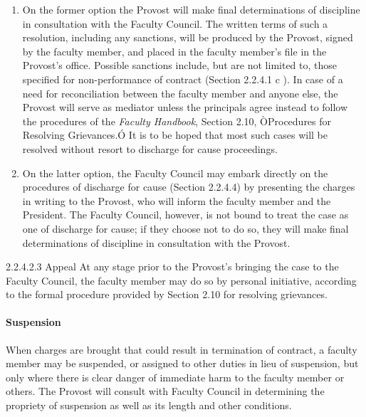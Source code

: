 \documentclass[letterpaper, 11pt]{article}
\begin{document}
\begin{enumerate}[label=\alph*)]
{						\begin{enumerate}[label=\arabic*)]
							\item{On the former option the Provost will make final determinations of discipline in consultation with the Faculty Council.  The written terms of such a resolution, including any sanctions, will be produced by the Provost, signed by the faculty member, and placed in the faculty member's file in the Provost's office.  Possible sanctions include, but are not limited to, those specified for non-performance of contract (Section 2.2.4.1 c ).  In case of a need for reconciliation between the faculty member and anyone else, the Provost will serve as mediator unless the principals agree instead to follow the procedures of the \emph{Faculty Handbook}, Section 2.10, ÒProcedures for Resolving Grievances.Ó  It is to be hoped that most such cases will be resolved without resort to discharge for cause proceedings.}
							\item{On the latter option, the Faculty Council may embark directly on the procedures of discharge for cause (Section 2.2.4.4) by presenting the charges in writing to the Provost, who will inform the faculty member and the President.  The Faculty Council, however, is not bound to treat the case as one of discharge for cause; if they choose not to do so, they will make final determinations of discipline in consultation with the Provost.}
						\end{enumerate}
					}
				\end{enumerate}
				2.2.4.2.3 Appeal
				At any stage prior to the Provost's bringing the case to the Faculty Council, the faculty member may do so by personal initiative, according to the formal procedure provided by Section 2.10 for resolving grievances.
			\paragraph{Suspension}
				When charges are brought that could result in termination of contract, a faculty member may be suspended, or assigned to other duties in lieu of suspension, but only where there is clear danger of immediate harm to the faculty member or others.  The Provost will consult with Faculty Council in determining the propriety of suspension as well as its length and other conditions.
\end{document}
